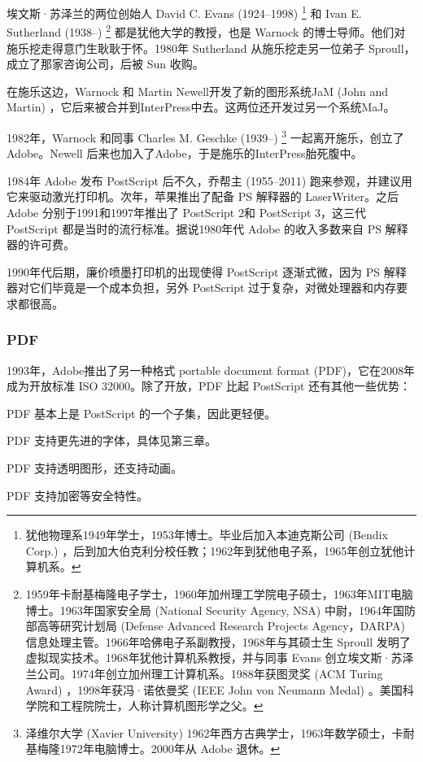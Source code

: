 埃文斯·苏泽兰的两位创始人 David C. Evans (1924--1998)\indexEvans{} \footnote{犹他物理系1949年学士，1953年博士。毕业后加入本迪克斯公司 (Bendix Corp.) ，后到加大伯克利分校任教；1962年到犹他电子系，1965年创立犹他计算机系。} 和 Ivan E. Sutherland (1938--)\indexSutherland{} \footnote{1959年卡耐基梅隆电子学士，1960年加州理工学院电子硕士，1963年MIT电脑博士。1963年国家安全局 (National Security Agency, NSA) 中尉，1964年国防部高等研究计划局 (Defense Advanced Research Projects Agency，DARPA) 信息处理主管。1966年哈佛电子系副教授，1968年与其硕士生 Sproull 发明了虚拟现实技术。1968年犹他计算机系教授，并与同事 Evans 创立埃文斯·苏泽兰公司。1974年创立加州理工计算机系。1988年获图灵奖 (ACM Turing Award) ，1998年获冯·诺依曼奖 (IEEE John von Neumann Medal) 。美国科学院和工程院院士，人称计算机图形学之父。} 都是犹他大学的教授，也是 Warnock 的博士导师。他们对施乐挖走得意门生耿耿于怀。1980年 Sutherland 从施乐挖走另一位弟子 Sproull，成立了那家咨询公司，后被 Sun 收购。

在施乐这边，Warnock 和 Martin Newell\indexNewell 开发了新的图形系统JaM (John and Martin) ，它后来被合并到InterPress中去。这两位还开发过另一个系统MaJ。

1982年，Warnock 和同事 Charles M. Geschke (1939--)\indexGeschke{} \footnote{泽维尔大学 (Xavier University) 1962年西方古典学士，1963年数学硕士，卡耐基梅隆1972年电脑博士。2000年从 Adobe 退休。} 一起离开施乐，创立了Adobe\indexAdobe{}。Newell 后来也加入了Adobe，于是施乐的InterPress胎死腹中。

1984年 Adobe 发布 PostScript 后不久，乔帮主 (1955--2011)\indexJobs{} 跑来参观，并建议用它来驱动激光打印机。次年，苹果推出了配备 PS 解释器的 LaserWriter。之后 Adobe 分别于1991和1997年推出了 PostScript 2和 PostScript 3，这三代 PostScript 都是当时的流行标准。据说1980年代 Adobe 的收入多数来自 PS 解释器的许可费。

1990年代后期，廉价喷墨打印机的出现使得 PostScript 逐渐式微，因为 PS 解释器对它们毕竟是一个成本负担，另外 PostScript 过于复杂，对微处理器和内存要求都很高。

\subsubsection{PDF}
1993年，Adobe推出了另一种格式 portable document format (PDF)，它在2008年成为开放标准 ISO\indexISO{} 32000。除了开放，PDF 比起 PostScript 还有其他一些优势：

\begin{compactitem}
  \item PDF 基本上是 PostScript 的一个子集，因此更轻便。
  \item PDF 支持更先进的字体，具体见第三章。
  \item PDF 支持透明图形，还支持动画。
  \item PDF 支持加密等安全特性。
\end{compactitem}

